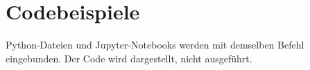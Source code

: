 \section{Codebeispiele}\label{sec:sample_code}
Python-Dateien und Jupyter-Notebooks werden mit demselben Befehl eingebunden. Der Code wird dargestellt, nicht ausgeführt.
